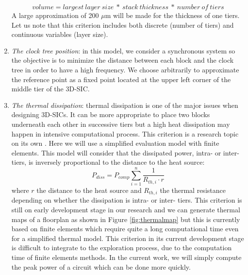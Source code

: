 \begin{enumerate}
\begin{equation}
volume=largest~layer~size~*~stack~thickness~*~number~of~tiers
\label{eqn:volume}
\end{equation}
A large approximation of 200 $\mu$m will be made for the thickness of one tiers.
Let us note that this criterion includes both discrete (number of tiers) and continuous variables (layer size).
\item \textit{The clock tree position}: in this model, we consider a synchronous system so the objective is to minimize the distance between each block and the clock tree in order to have a high frequency. We choose arbitrarily to approximate the reference point as a fixed point located at the upper left corner of the middle tier of the 3D-SIC.
\item \textit{The thermal dissipation}: thermal dissipation is one of the major issues when designing 3D-SICs. It can be more appropriate to place two blocks underneath each other in successive tiers but a high heat dissipation may happen in intensive computational process. This criterion is a research topic on its own \cite{1112292, 1486402}. Here we will use a simplified evaluation model with finite elements. This model will consider that the dissipated power, intra- or inter- tiers, is inversely proportional to the distance to the heat source:
\begin{equation}
P_{diss} = P_{comp} \sum_{i=1}^{n} \frac{1}{R_{th, i} \cdot r}
\label{eqn:pdiss}
\end{equation}
where $r$ the distance to the heat source and $R_{th, i}$ the thermal resistance depending on whether the dissipation is intra- or inter- tiers.
This criterion is still on early development stage in our research and we can generate thermal maps of a floorplan as shown in Figure \ref{fig:thermalmap} but this is currently based on finite elements \cite{4263187} which require quite a long computational time even for a simplified thermal model.
This criterion in its current development stage is difficult to integrate to the exploration process, due to the computation time of finite elements methods. In the current work, we will simply compute the peak power of a circuit which can be done more quickly.


\end{enumerate}
